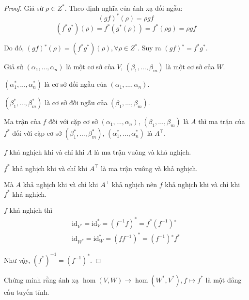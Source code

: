 \begin{proof}
    Giả sử $\rho\in Z^{*}$. Theo định nghĩa của ánh xạ đối ngẫu:
    \[
        {(gf)}^{*}(\rho) = \rho gf
    \]
    \[
        (f^{*}g^{*})(\rho) = f^{*}(g^{*}(\rho)) = f^{*}(\rho g) = \rho gf
    \]
    
    Do đó, $(gf){}^{*}(\rho) = (f^{*}g^{*})(\rho), \forall\rho\in Z^{*}$. Suy ra $(gf){}^{*} = f^{*}g^{*}$.
    
    \bigskip
    
    Giả sử $(\alpha_{1}, \ldots, \alpha_{n})$ là một cơ sở của $V$, $(\beta_{1}, \ldots, \beta_{m})$ là một cơ sở của $W$.
    
    $(\alpha^{*}_{1}, \ldots, \alpha^{*}_{n})$ là cơ sở đối ngẫu của $(\alpha_{1}, \ldots, \alpha_{n})$.
    
    $(\beta^{*}_{1}, \ldots, \beta^{*}_{m})$ là cơ sở đối ngẫu của $(\beta_{1}, \ldots, \beta_{m})$.
    
    Ma trận của $f$ đối với cặp cơ sở $(\alpha_{1}, \ldots, \alpha_{n})$, $(\beta_{1}, \ldots, \beta_{m})$ là $A$  thì ma trận của $f^{*}$ đối với cặp cơ sở $(\beta^{*}_{1}, \ldots, \beta^{*}_{m})$, $(\alpha^{*}_{1}, \ldots, \alpha^{*}_{n})$ là $A^{\top}$.
    
    $f$ khả nghịch khi và chỉ khi $A$ là ma trận vuông và khả nghịch.
    
    $f^{*}$ khả nghịch khi và chỉ khi $A^{\top}$ là ma trận vuông và khả nghịch.
    
    Mà $A$ khả nghịch khi và chỉ khi $A^{\top}$ khả nghịch nên $f$ khả nghịch khi và chỉ khi $f^{*}$ khả nghịch.
    
    \bigskip
    
    $f$ khả nghịch thì
    \[
        \begin{split}
            \text{id}_{V^{*}} = \text{id}^{*}_{V} = {(f^{-1}f)}^{*} = f^{*}(f^{-1}){}^{*} \\
            \text{id}_{W^{*}} = \text{id}^{*}_{W} = {(ff^{-1})}^{*} = (f^{-1}){}^{*}f^{*}
        \end{split}
    \]
    
    Như vậy, ${(f^{*})}^{-1} = {(f^{-1})}^{*}$.
\end{proof}

\begin{exercise}
    Chứng minh rằng ánh xạ $\hom(V, W)\to\hom(W^{*}, V^{*}), f\mapsto f^{*}$ là một đẳng cấu tuyến tính.
\end{exercise}

